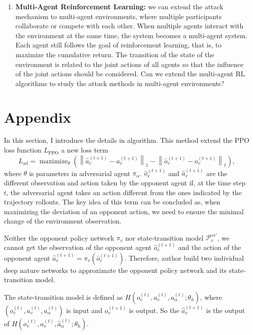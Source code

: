 \documentclass[a4paper]{article}
\begin{document}
\begin{enumerate}
    \item \textbf{Multi-Agent Reinforcement Learning: }we can extend the attack mechanism to multi-agent environments, where multiple participants collaborate or compete with each other.
    When multiple agents interact with the environment at the same time, the system becomes a multi-agent system. Each agent still follows the goal of reinforcement learning, that is, to maximize the cumulative return. 
    The transition of the state of the environment is related to the joint actions of all agents so that the influence of the joint actions should be considered.
    Can we extend the multi-agent RL algorithms to study the attack methods in multi-agent environments?
\end{enumerate}

\clearpage



\section*{Appendix}
In this section, I introduce the details in algorithm. This method extend the PPO loss function $L_\text{PPO}$ a new loss term
\begin{equation}
    L_\text{ad}=\operatorname{maximize}_{\theta}\left(\left\|\hat{a}_{v}^{(t+1)}-a_{v}^{(t+1)}\right\|_{1}-\left\|\hat{o}_{v}^{(t+1)}-o_{v}^{(t+1)}\right\|_{1}\right),
\end{equation}
where $\theta$ is parameters in adversarial agent $\pi_\alpha$.
$\hat{o}_v^{(t+1)}$ and $\hat{a}_v^{(t+1)}$ are the different observation and action taken by the opponent agent if, 
at the time step $t$, the adversarial agent takes an action different from the ones indicated by the trajectory rollouts.
The key idea of this term can be concluded as, 
when maximizing the deviation of an opponent action,
we need to ensure the minimal change of the environment observation. 

Neither the opponent policy network $\pi_v$ nor state-transition model $\mathcal{P}_v^{ss'}$,
we cannot get the observation of the opponent agent $\hat{o}_v^{(t+1)}$ and the action of the opponent agent $\hat{a}_v^{(t+1)} = \pi_v(\hat{o}_v^{(t+1)})$.
Therefore, author build two individual deep nature networks to approximate the opponent policy network and its state-transition model.

The state-transition model is defined as $H(o_v^{(t)},a_v^{(t)},a_\alpha^{(t)}; \theta_h)$, where $(o_v^{(t)},a_v^{(t)},a_\alpha^{(t)})$ is input and $o_v^{(t+1)}$ is output.
So the $\hat{a}_{v}^{(t+1)}$ is the output of $H(o_v^{(t)},a_v^{(t)},\hat{a}_\alpha^{(t)}; \theta_h)$.
\end{document}
